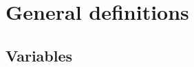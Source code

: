 \documentclass[12pt,a4paper]{article}
\begin{document}

\section{General definitions}


\subsection{Variables}
\end{document}
